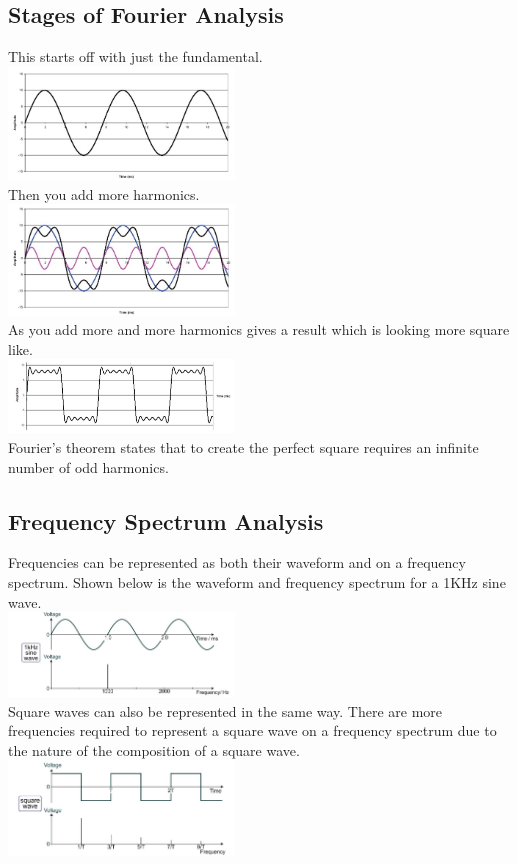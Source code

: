 \documentclass[a4paper,11pt, twocolumn]{article}
\begin{document}
\subsection{Stages of Fourier Analysis}
This starts off with just the fundamental.\\
\includegraphics[width=0.45\textwidth]{fourier1.jpg}\\
Then you add more harmonics.\\
\includegraphics[width=0.45\textwidth]{fourier2.jpg}\\
As you add more and more harmonics gives a result which is looking more square like.\\
\includegraphics[width=0.45\textwidth]{fourier3.jpg}\\
Fourier's theorem states that to create the perfect square requires an infinite number of odd harmonics. 
\subsection{Frequency Spectrum Analysis}
Frequencies can be represented as both their waveform and on a frequency spectrum. Shown below is the waveform and frequency spectrum for a 1KHz sine wave.\\
\includegraphics[width=0.45\textwidth]{sineFrequencySpectrum.jpg}\\
Square waves can also be represented in the same way. There are more frequencies required to represent a square wave on a frequency spectrum due to the nature of the composition of a square wave.
\includegraphics[width=0.45\textwidth]{squareFrequencySpectrum.jpg}
\end{document}
